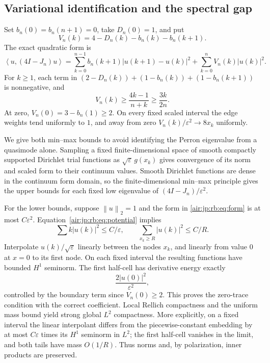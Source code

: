 \documentclass[11pt,letterpaper]{article}
\numberwithin{equation}{section}
\theoremstyle{remark}
\newcommand{\norm}[1]{\left\lVert#1\right\rVert}
\newcommand{\ip}[2]{\left\langle#1,#2\right\rangle}
\newcommand{\eps}{\varepsilon}
\begin{document}
\subsection{Variational identification and the spectral gap}
Set $b_n(0)=b_n(n+1)=0$, take $D_n(0)=1$, and put
\[
 V_n(k)=4-D_n(k)-b_n(k)-b_n(k+1).
\]
The exact quadratic form is
\begin{equation}\label{air:jp:rb:eq:form}
 \ip{u}{(4I-J_n)u}
 =\sum_{k=0}^{n-1}b_n(k+1)|u(k+1)-u(k)|^2
  +\sum_{k=0}^nV_n(k)|u(k)|^2.
\end{equation}
For $k\ge1$, each term in
$(2-D_n(k))+(1-b_n(k))+(1-b_n(k+1))$ is nonnegative, and
\begin{equation}\label{air:jp:rb:eq:potential}
 V_n(k)\ge\frac{4k-1}{n+k}\ge\frac{3k}{2n}.
\end{equation}
At zero, $V_n(0)=3-b_n(1)\ge2$.
On every fixed scaled interval the edge weights tend uniformly to $1$, and away from zero $V_n(k)/\eps^2\to8x_k$ uniformly.

We give both min--max bounds to avoid identifying the Perron eigenvalue from a quasimode alone. Sampling a fixed finite-dimensional space of smooth compactly supported Dirichlet trial functions as $\sqrt\eps\,g(x_k)$ gives convergence of its norm and scaled form to their continuum values. Smooth Dirichlet functions are dense in the continuum form domain, so the finite-dimensional min--max principle gives the upper bounds for each fixed low eigenvalue of $(4I-J_n)/\eps^2$.

For the lower bounds, suppose $\norm u_2=1$ and the form in \eqref{air:jp:rb:eq:form} is at most $C\eps^2$. Equation~\eqref{air:jp:rb:eq:potential} implies
\[
 \sum k|u(k)|^2\le C/\eps,\qquad
 \sum_{x_k\ge R}|u(k)|^2\le C/R.
\]
Interpolate $u(k)/\sqrt\eps$ linearly between the nodes $x_k$, and linearly from value $0$ at $x=0$ to its first node. On each fixed interval the resulting functions have bounded $H^1$ seminorm. The first half-cell has derivative energy exactly
\[
 \frac{2|u(0)|^2}{\eps^2},
\]
controlled by the boundary term since $V_n(0)\ge2$. This proves the zero-trace condition with the correct coefficient. Local Rellich compactness and the uniform mass bound yield strong global $L^2$ compactness. More explicitly, on a fixed interval the linear interpolant differs from the piecewise-constant embedding by at most $C\eps$ times its $H^1$ seminorm in $L^2$; the first half-cell vanishes in the limit, and both tails have mass $O(1/R)$. Thus norms and, by polarization, inner products are preserved.
\end{document}
